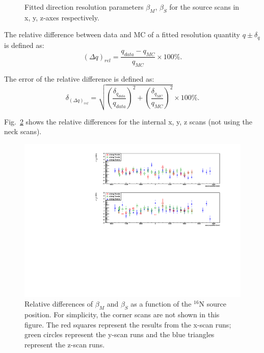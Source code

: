 \begin{figure}
	\caption{Fitted direction resolution parameters $\beta_M$, $\beta_S$ for the source scans in x, y, z-axes respectively.}
	\label{angularResolScan}
\end{figure}

The relative difference between data and MC of a fitted resolution quantity $q\pm \delta_q$ is defined as:
\begin{equation}
(\Delta q)_{rel} = \frac{q_{data}-q_{MC}}{q_{MC}}\times 100\%.
\end{equation}

The error of the relative difference is defined as: 
\begin{equation}
\delta_{(\Delta q)_{rel}} = \sqrt{(\frac{\delta_{q_{data}}}{q_{data}})^2+(\frac{\delta_{q_{MC}}}{q_{MC}})^2}\times 100\%.
\end{equation}\label{eq:erors_relativeBiases}

Fig.~\ref{relative_biasesVsPositions} shows the relative differences for the internal x, y, z scans (not using the neck scans).
\begin{figure}[!htb]
	\centering
	\includegraphics[width=16cm]{angularResol_scanXYZ.pdf}
	\caption[Relative differences of $\beta_M$ and $\beta_S$ as a function of the $^{16}$N source position.]{Relative differences of $\beta_M$ and $\beta_S$ as a function of the $^{16}$N source position. For simplicity, the corner scans are not shown in this figure. The red squares represent the results from the x-scan runs; green circles represent the y-scan runs and the blue triangles represent the z-scan runs.}
	\label{relative_biasesVsPositions}
\end{figure}

